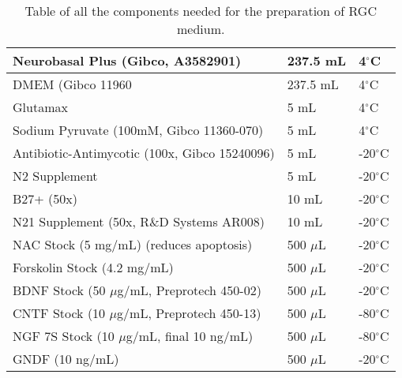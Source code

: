 \documentclass{book}
\begin{document}
\begin{table}[H]
    \begin{tabular}{| m{8cm}| m{2.5cm} | m{2.5cm} | }
        \hline
Neurobasal Plus (Gibco, A3582901) & 237.5 mL & 4$^{\circ}$C \\ 
\hline
DMEM (Gibco 11960 & 237.5 mL & 4$^{\circ}$C \\ 
\hline
Glutamax & 5 mL & 4$^{\circ}$C \\ 
\hline
Sodium Pyruvate (100mM, Gibco 11360-070) & 5 mL & 4$^{\circ}$C \\ 
\hline
Antibiotic-Antimycotic (100x, Gibco 15240096) & 5 mL & -20$^{\circ}$C \\ 
\hline
N2 Supplement & 5 mL & -20$^{\circ}$C \\
\hline
B27+ (50x) & 10 mL & -20$^{\circ}$C \\
\hline
N21 Supplement (50x, R$\&$D Systems AR008) & 10 mL & -20$^{\circ}$C \\
\hline
NAC Stock (5 mg/mL) (reduces apoptosis) & 500 $\mu$L & -20$^{\circ}$C \\
\hline
Forskolin Stock (4.2 mg/mL) & 500 $\mu$L & -20$^{\circ}$C \\
\hline
BDNF Stock (50 $\mu$g/mL, Preprotech 450-02) & 500 $\mu$L & -20$^{\circ}$C \\
\hline
CNTF Stock (10 $\mu$g/mL, Preprotech 450-13) & 500 $\mu$L & -80$^{\circ}$C \\
\hline
NGF 7S Stock (10 $\mu$g/mL, final 10 ng/mL) & 500 $\mu$L & -80$^{\circ}$C \\
\hline
GNDF (10 ng/mL) & 500 $\mu$L & -20$^{\circ}$C \\
\hline
    \end{tabular}
    \caption{Table of all the components needed for the preparation of RGC medium.}
    \label{coatingtests}
    
\end{table}
\end{document}

